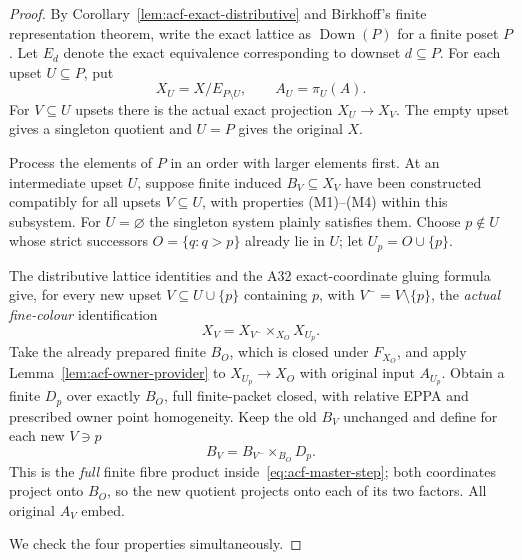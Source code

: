 \begin{proof}
By Corollary~\ref{lem:acf-exact-distributive}
and Birkhoff's finite representation theorem,
write the exact lattice as \(\operatorname{Down}(P)\)
for a finite poset \(P\).  Let \(E_d\)
denote the exact equivalence corresponding
to downset \(d\subseteq P\).  For each upset
\(U\subseteq P\), put
\[
             X_U=X/E_{P\setminus U},
        \qquad A_U=\pi_U(A).
\]
For \(V\subseteq U\) upsets there is the actual
exact projection \(X_U\to X_V\).
The empty upset gives a singleton quotient
and \(U=P\) gives the original \(X\).

Process the elements of \(P\) in an order
with larger elements first.  At an intermediate
upset \(U\), suppose finite induced
\(B_V\subseteq X_V\) have been constructed
compatibly for all upsets \(V\subseteq U\),
with properties (M1)--(M4) within this
subsystem.  For \(U=\varnothing\) the
singleton system plainly satisfies them.
Choose \(p\notin U\) whose strict successors
\(O=\{q:q>p\}\) already lie in \(U\);
let \(U_p=O\cup\{p\}\).

The distributive lattice identities and the
A32 exact-coordinate gluing formula give, for
every new upset \(V\subseteq U\cup\{p\}\)
containing \(p\), with \(V^-=V\setminus\{p\}\),
the \emph{actual fine-colour} identification
\[
        X_V=X_{V^-}\times_{X_O}X_{U_p}.
        \tag{\(\ast\)}\label{eq:acf-master-step}
\]
Take the already prepared finite \(B_O\),
which is closed under \(F_{X_O}\), and apply
Lemma~\ref{lem:acf-owner-provider} to
\(X_{U_p}\to X_O\) with original input
\(A_{U_p}\).  Obtain a finite \(D_p\)
over exactly \(B_O\), full finite-packet
closed, with relative EPPA and prescribed
owner point homogeneity.  Keep the old
\(B_V\) unchanged and define for each
new \(V\ni p\)
\[
              B_V=B_{V^-}\times_{B_O}D_p.
              \tag{\(\ast\ast\)}
\]
This is the \emph{full} finite fibre product
inside~\eqref{eq:acf-master-step}; both
coordinates project onto \(B_O\), so the
new quotient projects onto each of its
two factors.  All original \(A_V\) embed.

We check the four properties simultaneously.


\end{proof}
